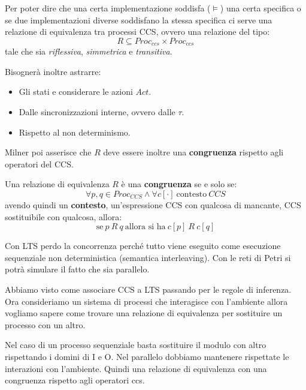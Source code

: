 Per poter dire che una certa implementazione soddisfa ($\models$) una certa
specifica o se due implementazioni diverse soddisfano la stessa specifica ci
serve una relazione di equivalenza tra processi CCS, ovvero una relazione del
tipo:
\begin{equation}
    R \subseteq Proc_{ccs} \times Proc_{ccs}
\end{equation}
tale che sia \textit{riflessiva}, \textit{simmetrica} e \textit{transitiva}.

Bisognerà inoltre astrarre:
\begin{itemize}
    \item Gli stati e considerare le azioni $Act$.
    \item Dalle sincronizzazioni interne, ovvero dalle $\tau$.
    \item Rispetto al non determinismo.
\end{itemize}
Milner poi asserisce che $R$ deve essere inoltre una \textbf{congruenza} rispetto
agli operatori del CCS.
\begin{definizione}
    Una relazione di equivalenza $R$ è una \textbf{congruenza} se e solo se:
    \begin{equation}
        \forall p, q \in Proc_{CCS} \land \forall c[\cdot] \ \text{contesto} \ CCS
    \end{equation}
    avendo quindi un \textbf{contesto}, un'espressione CCS con qualcosa di mancante,
    CCS sostituibile con qualcosa, allora:
    \begin{equation}
        \text{se} \ p\ R\ q \ \text{allora si ha} \ c[p] \ R \ c[q]
    \end{equation}
\end{definizione}
Con LTS perdo la concorrenza perché tutto viene eseguito come esecuzione
sequenziale non deterministica (semantica interleaving). Con le reti di Petri
si potrà simulare il fatto che sia parallelo.

Abbiamo visto come associare CCS a LTS passando per le regole di inferenza.
Ora consideriamo un sistema di processi che interagisce con l'ambiente allora
vogliamo sapere come trovare una relazione di equivalenza per sostituire un
processo con un altro.

Nel caso di un processo sequenziale basta sostituire il modulo con altro
rispettando i domini di I e O. Nel parallelo dobbiamo mantenere rispettate
le interazioni con l'ambiente. Quindi una relazione di equivalenza con una
congruenza rispetto agli operatori ccs.

